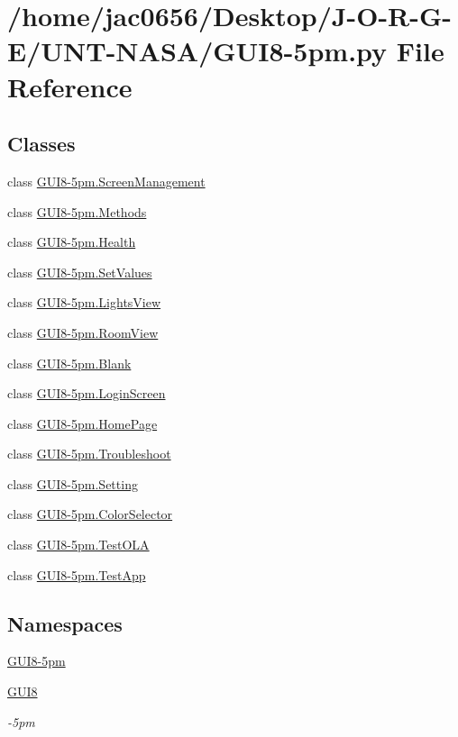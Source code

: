 \hypertarget{GUI8-5pm_8py}{}\section{/home/jac0656/\+Desktop/\+J-\/\+O-\/\+R-\/\+G-\/\+E/\+U\+N\+T-\/\+N\+A\+S\+A/\+G\+U\+I8-\/5pm.py File Reference}
\label{GUI8-5pm_8py}
\subsection*{Classes}
\begin{DoxyCompactItemize}
\item 
class \hyperlink{classGUI8-5pm_1_1ScreenManagement}{G\+U\+I8-\/5pm.\+Screen\+Management}
\item 
class \hyperlink{classGUI8-5pm_1_1Methods}{G\+U\+I8-\/5pm.\+Methods}
\item 
class \hyperlink{classGUI8-5pm_1_1Health}{G\+U\+I8-\/5pm.\+Health}
\item 
class \hyperlink{classGUI8-5pm_1_1SetValues}{G\+U\+I8-\/5pm.\+Set\+Values}
\item 
class \hyperlink{classGUI8-5pm_1_1LightsView}{G\+U\+I8-\/5pm.\+Lights\+View}
\item 
class \hyperlink{classGUI8-5pm_1_1RoomView}{G\+U\+I8-\/5pm.\+Room\+View}
\item 
class \hyperlink{classGUI8-5pm_1_1Blank}{G\+U\+I8-\/5pm.\+Blank}
\item 
class \hyperlink{classGUI8-5pm_1_1LoginScreen}{G\+U\+I8-\/5pm.\+Login\+Screen}
\item 
class \hyperlink{classGUI8-5pm_1_1HomePage}{G\+U\+I8-\/5pm.\+Home\+Page}
\item 
class \hyperlink{classGUI8-5pm_1_1Troubleshoot}{G\+U\+I8-\/5pm.\+Troubleshoot}
\item 
class \hyperlink{classGUI8-5pm_1_1Setting}{G\+U\+I8-\/5pm.\+Setting}
\item 
class \hyperlink{classGUI8-5pm_1_1ColorSelector}{G\+U\+I8-\/5pm.\+Color\+Selector}
\item 
class \hyperlink{classGUI8-5pm_1_1TestOLA}{G\+U\+I8-\/5pm.\+Test\+O\+LA}
\item 
class \hyperlink{classGUI8-5pm_1_1TestApp}{G\+U\+I8-\/5pm.\+Test\+App}
\end{DoxyCompactItemize}
\subsection*{Namespaces}
\begin{DoxyCompactItemize}
\item 
 \hyperlink{namespaceGUI8-5pm}{G\+U\+I8-\/5pm}
\item 
 \hyperlink{namespaceGUI8}{G\+U\+I8}
\begin{DoxyCompactList}\small\item\em -\/5pm \end{DoxyCompactList}\end{DoxyCompactItemize}
